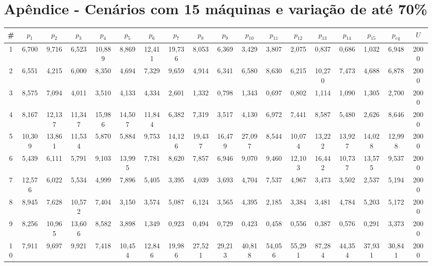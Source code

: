 
\newpage
\section{Apêndice - Cenários com 15 máquinas e variação de até 70\%}\label{app:tab15machine70}
{\tiny\tabcolsep=2pt %
\begin{longtable}{ >{\tiny}cccccccccccccccccc}
\hline
\#  & $p_1$     & $p_2$     & $p_3$     & $p_4$     & $p_5$     & $p_6$     & $p_7$     & $p_8$     & $p_9$     & $p_{10}$    & $p_{11}$    & $p_{12}$    & $p_{13}$    & $p_{14}$    & $p_{15}$    & $p_{eq}$    & $U$    \\ \hline
1   & 6,700  & 9,716  & 6,523  & 10,889 & 8,869  & 12,411 & 19,736 & 8,053  & 6,369  & 3,429  & 3,807  & 2,075   & 0,837   & 0,686   & 1,032   & 6,948   & 2000 \\
2   & 6,551  & 4,215  & 6,000  & 8,350  & 4,694  & 7,329  & 9,659  & 4,914  & 6,341  & 6,580  & 8,630  & 6,215   & 10,270  & 7,473   & 4,688   & 6,878   & 2000 \\
3   & 8,575  & 7,094  & 4,011  & 3,510  & 4,133  & 4,334  & 2,601  & 1,332  & 0,798  & 1,343  & 0,697  & 0,802   & 1,114   & 1,090   & 1,305   & 2,700   & 2000 \\
4   & 8,167  & 12,137 & 11,347 & 15,986 & 14,507 & 11,844 & 6,382  & 7,319  & 3,517  & 4,130  & 6,972  & 7,441   & 8,587   & 5,480   & 2,626   & 8,646   & 2000 \\
5   & 10,309 & 13,861 & 11,534 & 5,870  & 5,884  & 9,753  & 14,126 & 19,437 & 16,479 & 27,097 & 8,544  & 10,074  & 13,222  & 13,927  & 14,028  & 12,998  & 2000 \\
6   & 5,439  & 6,111  & 5,791  & 9,103  & 13,995 & 7,781  & 8,620  & 7,857  & 6,946  & 9,070  & 9,460  & 12,103  & 16,442  & 10,737  & 13,575  & 9,537   & 2000 \\
7   & 12,576 & 6,022  & 5,534  & 4,999  & 7,896  & 5,405  & 3,395  & 4,039  & 3,693  & 4,704  & 7,537  & 4,967   & 3,473   & 3,502   & 2,537   & 5,194   & 2000 \\
8   & 8,945  & 7,628  & 10,572 & 7,404  & 3,150  & 3,574  & 5,087  & 6,124  & 3,565  & 4,395  & 2,185  & 3,384   & 3,481   & 4,784   & 5,203   & 5,172   & 2000 \\
9   & 8,256  & 10,965 & 13,606 & 8,582  & 3,898  & 1,349  & 0,923  & 0,494  & 0,729  & 0,423  & 0,458  & 0,556   & 0,387   & 0,576   & 0,291   & 3,373   & 2000 \\
10  & 7,911  & 9,697  & 9,921  & 7,418  & 10,454 & 12,846 & 19,986 & 27,521 & 29,213 & 40,818 & 54,056 & 55,291  & 87,284  & 44,354  & 37,931  & 30,841  & 2000 \\

\end{longtable}}
